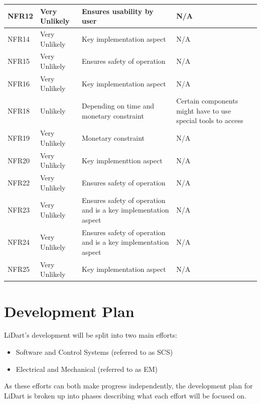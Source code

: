 \documentclass[12pt]{article}
\begin{document}
\begin{longtable}{ | p{2.3cm} | p{3.0cm} | p{4cm} | p{4cm} |}
\hline
NFR12 & Very Unlikely & Ensures usability by user & N/A \\
\hline
NFR14 & Very Unlikely & Key implementation aspect & N/A \\
\hline
NFR15 & Very Unlikely & Ensures safety of operation & N/A \\
\hline
NFR16 & Very Unlikely & Key implementation aspect & N/A \\
\hline
NFR18 & Unlikely & Depending on time and monetary constraint & Certain components might have to use special tools to access \\
\hline
NFR19 & Very Unlikely & Monetary constraint & N/A \\
\hline
NFR20 & Very Unlikcly & Key implementtion aspect & N/A \\
\hline
NFR22 & Very Unlikely & Ensures safety of operation & N/A \\
\hline
NFR23 & Very Unlikely & Ensures safety of operation and is a key implementation aspect & N/A \\
\hline
NFR24 & Very Unlikely & Ensures safety of operation and is a key implementation aspect & N/A \\
\hline
NFR25 & Very Unlikely & Key implementation aspect & N/A \\
\hline
\end{longtable}

\section{Development Plan}
\label{sec_dp}

LiDart's development will be split into two main efforts:
\begin{itemize}
    \item Software and Control Systems (referred to as SCS)
    \item Electrical and Mechanical (referred to as EM)
\end{itemize}

As these efforts can both make progress independently, the development plan for
LiDart is broken up into phases describing what each effort will be focused on.
\end{document}
